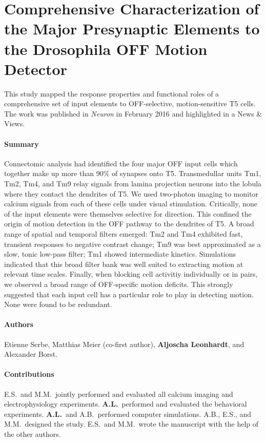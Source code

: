\section{Comprehensive Characterization of the Major Presynaptic Elements to the Drosophila OFF Motion Detector}
\label{sct:manuscript_serbe}

This study mapped the response properties and functional roles of a comprehensive set of input elements to OFF-selective, motion-sensitive T5 cells. The work was published in \textit{Neuron} in February 2016 and highlighted in a News \& Views.

\paragraph{Summary}
Connectomic analysis had identified the four major OFF input cells which together make up more than 90\% of synapses onto T5. Transmedullar units Tm1, Tm2, Tm4, and Tm9 relay signals from lamina projection neurons into the lobula where they contact the dendrites of T5. We used two-photon imaging to monitor calcium signals from each of these cells under visual stimulation. Critically, none of the input elements were themselves selective for direction. This confined the origin of motion detection in the OFF pathway to the dendrites of T5. A broad range of spatial and temporal filters emerged: Tm2 and Tm4 exhibited fast, transient responses to negative contrast change; Tm9 was best approximated as a slow, tonic low-pass filter; Tm1 showed intermediate kinetics. Simulations indicated that this broad filter bank was well suited to extracting motion at relevant time scales. Finally, when blocking cell activitiy individually or in pairs, we observed a broad range of OFF-specific motion deficits. This strongly suggested that each input cell has a particular role to play in detecting motion. None were found to be redundant.

\paragraph{Authors} Etienne Serbe, Matthias Meier (co-first author), \textbf{Aljoscha Leonhardt}, and Alexander Borst.

\paragraph{Contributions} E.S.\ and M.M.\ jointly performed and evaluated all calcium imaging and electrophysiology experiments. \textbf{A.L.}\ performed and evaluated the behavioral experiments. \textbf{A.L.}\ and A.B.\ performed computer simulations. A.B., E.S., and M.M.\ designed the study. E.S.\ and M.M.\ wrote the manuscript with the help of the other authors.

\cleardoublepage


